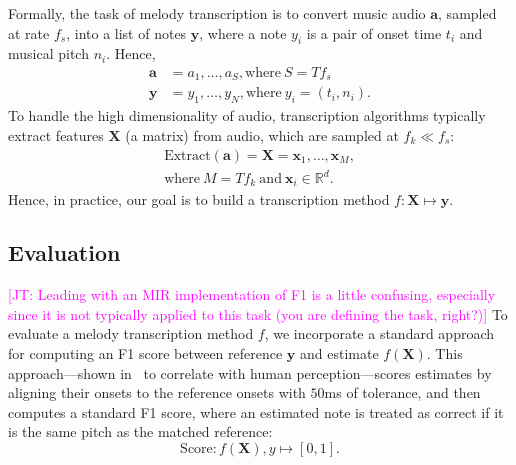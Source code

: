 \documentclass{article}
\newcommand{\fone}{F1}
\newcommand\john[1]{\textcolor{magenta}{[JT: #1]}}
\begin{document}
Formally, the task of melody transcription is to convert music audio $\bm{a}$, sampled at rate $f_s$, into a list of notes $\bm{y}$, where a note $y_i$ is a pair of onset time $t_i$ and musical pitch $n_i$. Hence, 
\begin{align*}
    \bm{a} &= a_1, \ldots, a_S, \text{where}~S = Tf_s \\
    \bm{y} &= y_1, \ldots, y_N, \text{where}~y_i = (t_i, n_i).
\end{align*}
To handle the high dimensionality of audio, transcription algorithms typically extract features $\bm{X}$ (a matrix) from audio, which are sampled at $f_k \ll f_s$:
\begin{align*}
    \text{Extract}(\bm{a}) = \bm{X} = \bm{x}_1, \ldots, \bm{x}_M, \\ 
    \text{where}~M = Tf_k~\text{and}~\bm{x}_i \in \mathbb{R}^d.
\end{align*}
Hence, in practice, our goal is to build a transcription method 
$f : \bm{X} \mapsto \bm{y}$.

\subsection{Evaluation}
\label{sec:eval}

\john{Leading with an MIR implementation of F1 is a little confusing, especially since it is not typically applied to this task (you are defining the task, right?)}
To evaluate a melody transcription method $f$, 
we incorporate a standard approach~\cite{raffel2014eval} for computing an \fone{} score between reference $\bm{y}$ and estimate $f(\bm{X})$. 
This approach---shown in~\cite{ycart2020investigating} to correlate with human perception---scores estimates by aligning their onsets to the reference onsets with $50$ms of tolerance, and then computes a standard \fone{} score, where an estimated note is treated as correct if it is the same pitch as the matched reference:
\begin{equation*}
    \text{Score} : f(\bm{X}), y \mapsto [0, 1].
\end{equation*}
\end{document}
